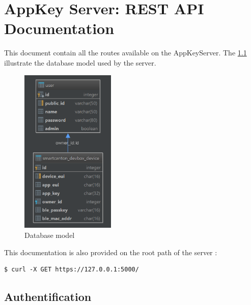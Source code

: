 
\appendixpagenumbering %

\chapter{AppKey Server: REST API Documentation} %
\label{AppendixRestApiDoc} 

This document contain all the routes available on the AppKeyServer. The \cref{figapdx-database_model} illustrate the database model used by the server.

\begin{figure}[ht!]
    \centering
    \includegraphics[width=0.4\textwidth]{Figures/Appendixes/database_model.PNG}
    \caption{Database model}
    \label{figapdx-database_model}
\end{figure}

This documentation is also provided on the root path of the server : 


\begin{tcolorbox}[top=-3mm, bottom=-3mm, left=0mm, right=0mm, enhanced, breakable, colback=LightGray, colframe=DarkGray, colbacktitle=DarkGray]
\begin{verbatim}
$ curl -X GET https://127.0.0.1:5000/
\end{verbatim}
\end{tcolorbox}

\clearpage
\section{Authentification}


